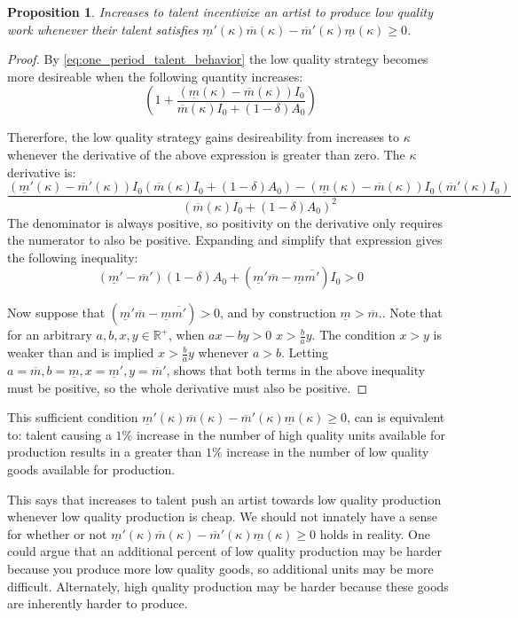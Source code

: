 \documentclass[
]{article}
\newtheorem{prop}{Proposition}
\begin{document}
\begin{prop}
Increases to talent incentivize an artist to produce low quality work whenever their talent satisfies $\underline{m}'(\kappa)\overline{m}(\kappa)-\overline{m}'(\kappa)\underline{m}(\kappa)\geq 0$.
\end{prop}

\begin{proof}
By \ref{eq:one_period_talent_behavior} the low quality strategy becomes more desireable when the following quantity increases:  $$\left(1+\frac{(\underline{m}(\kappa)-\overline{m}(\kappa))I_0}{\overline{m}(\kappa)I_0+(1-\delta)A_0}\right)$$

Thererfore, the low quality strategy gains desireability from increases to $\kappa$ whenever the derivative of the above expression is greater than zero. The $\kappa$ derivative is:
$$
\frac{(\underline{m}'(\kappa)-\overline{m}'(\kappa))I_0\left(\overline{m}(\kappa)I_0+(1-\delta)A_0\right)-(\underline{m}(\kappa)-\overline{m}(\kappa))I_0\left(\overline{m}'(\kappa)I_0\right)}{\left(\overline{m}(\kappa)I_0+(1-\delta)A_0\right)^2}
$$
The denominator is always positive, so positivity on the derivative only requires the numerator to also be positive. Expanding and simplify that expression gives the following inequality:
$$
(\underline{m}'-\overline{m}')(1-\delta)A_0+(\underline m'\overline m-\underline m\overline{m'})I_0>0
$$

Now suppose that $(\underline m'\overline m-\underline m\overline{m'})>0$, and by construction $\underline{m}>\overline{m}$.. Note that for an arbitrary $a,b,x,y\in \mathbb{R}^+$, when $ax-by>0$ $x>\frac{b}{a}y$. The condition $x>y$ is weaker than and is implied $x>\frac{b}{a}y$ whenever $a>b$. Letting $a=\overline{m},b=\underline{m},x=\underline m',y=\overline m '$, shows that both terms in the above inequality must be positive, so the whole derivative must also be positive.
\end{proof}

This sufficient condition
\(\underline{m}'(\kappa)\overline{m}(\kappa)-\overline{m}'(\kappa)\underline{m}(\kappa)\geq 0\),
can is equivalent to: talent causing a \(1\%\) increase in the number of
high quality units available for production results in a greater than
\(1\%\) increase in the number of low quality goods available for
production.

This says that increases to talent push an artist towards low quality
production whenever low quality production is cheap. We should not
innately have a sense for whether or not
\(\underline{m}'(\kappa)\overline{m}(\kappa)-\overline{m}'(\kappa)\underline{m}(\kappa)\geq 0\)
holds in reality. One could argue that an additional percent of low
quality production may be harder because you produce more low quality
goods, so additional units may be more difficult. Alternately, high
quality production may be harder because these goods are inherently
harder to produce.
\end{document}
